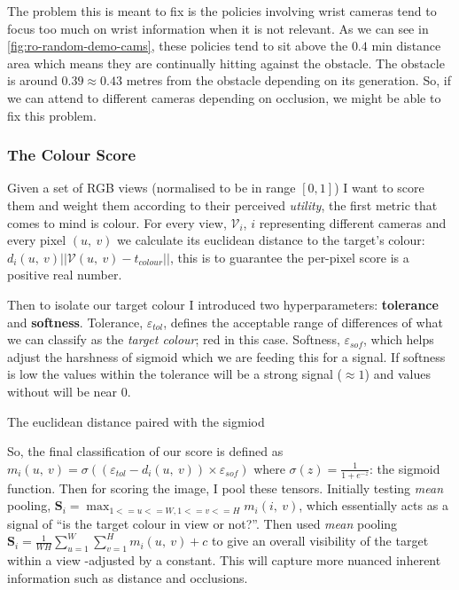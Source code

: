 The problem this is meant to fix is the policies involving wrist cameras tend to focus too much on wrist information when it is not relevant. As we can see in \ref{fig:ro-random-demo-cams}, these policies tend to sit above the $0.4$ min distance area which means they are continually hitting against the obstacle. The obstacle is around $0.39 \approx 0.43$ metres from the obstacle depending on its generation. So, if we can attend to different cameras depending on occlusion, we might be able to fix this problem.

\subsubsection{The Colour Score}
Given a set of RGB views (normalised to be  in range \(\left[0, 1\right]\)) I want to score them and weight them according to their perceived \emph{utility}, the first metric that comes to mind is colour. For every view, $\mathcal{V}_i$, $i$ representing different cameras and every pixel $\left( u, ~v\right)$ we calculate its euclidean distance to the target's colour: \( d_i\left(u, ~v\right)||\mathcal{V}\left(u, ~v\right) - t_{colour}||\), this is to guarantee the per-pixel score is a positive real number. 


Then to isolate our target colour I introduced two hyperparameters: \textbf{tolerance} and \textbf{softness}. Tolerance, $\varepsilon_{tol}$, defines the acceptable range of differences of what we can classify as the \emph{target colour}; red in this case. Softness, $\varepsilon_{sof}$, which helps adjust the harshness of sigmoid which we are feeding this for a signal. If softness is low the values within the tolerance will be a strong signal ($\approx 1$) and values without will be near $0$. 

The euclidean distance paired with the sigmiod

So, the final classification of our score is defined as \(m_i\left(u, ~v\right) = \sigma \left(\left(\varepsilon_{tol} - d_i\left(u, ~v\right)\right)\times \varepsilon_{sof} \right)\) where \(\sigma\left(z\right) = \frac{1}{1 + e^{-z}}\): the sigmoid function. 
Then for scoring the image, I pool these tensors. Initially testing \emph{mean} pooling, \(\mathbf{S}_i = \max_{1<=u<=W, 1<=v<=H}m_i(i, ~v)\), which essentially acts as a signal of ``is the target colour in view or not?''. Then used \emph{mean} pooling \(\mathbf{S}_i = {\frac{1}{WH}\sum_{u = 1}^{W}\sum_{v = 1}^{H}m_i\left(u, ~v\right)} + c\) to give an overall visibility of the target within a view -adjusted by a constant. This will capture more nuanced inherent information such as distance and occlusions.

